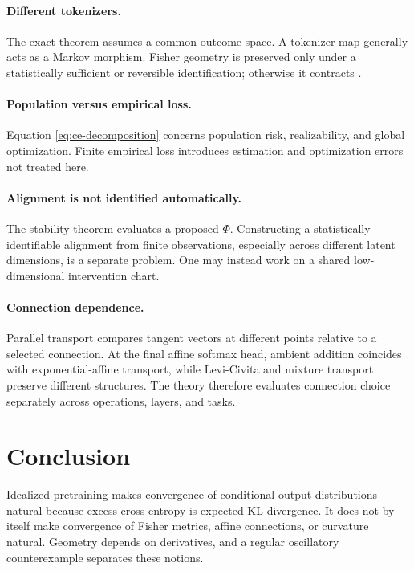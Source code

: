 \documentclass[11pt]{article}
\theoremstyle{definition}
\theoremstyle{remark}
\begin{document}
\paragraph{Different tokenizers.}
The exact theorem assumes a common outcome space. A tokenizer map generally acts as a Markov morphism. Fisher geometry is preserved only under a statistically sufficient or reversible identification; otherwise it contracts \citep{ayJostLeSchwachhofer2015}.

\paragraph{Population versus empirical loss.}
Equation \eqref{eq:ce-decomposition} concerns population risk, realizability, and global optimization. Finite empirical loss introduces estimation and optimization errors not treated here.

\paragraph{Alignment is not identified automatically.}
The stability theorem evaluates a proposed $\Phi$. Constructing a statistically identifiable alignment from finite observations, especially across different latent dimensions, is a separate problem. One may instead work on a shared low-dimensional intervention chart.

\paragraph{Connection dependence.}
Parallel transport compares tangent vectors at different points relative to a selected connection. At the final affine softmax head, ambient addition coincides with exponential-affine transport, while Levi-Civita and mixture transport preserve different structures. The theory therefore evaluates connection choice separately across operations, layers, and tasks.

\section{Conclusion}

Idealized pretraining makes convergence of conditional output distributions natural because excess cross-entropy is expected KL divergence. It does not by itself make convergence of Fisher metrics, affine connections, or curvature natural. Geometry depends on derivatives, and a regular oscillatory counterexample separates these notions.
\end{document}
